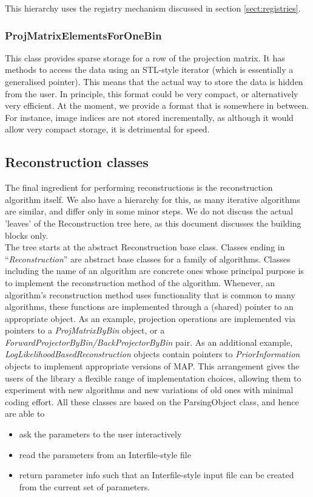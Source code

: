 \documentclass{article}
\begin{document}
This hierarchy uses the registry mechanism discussed in section 
\ref{sect:registries}.


\subsubsection{
ProjMatrixElementsForOneBin }

This class provides sparse storage for a row of the projection 
matrix. It has methods to access the data using an STL-style 
iterator (which is essentially a generalised pointer). This means 
that the actual way to store the data is hidden from the user. 
In principle, this format could be very compact, or alternatively 
very efficient. At the moment, we provide a format that is somewhere 
in between. For instance, image indices are not stored incrementally, 
as although it would allow very compact storage, it is detrimental 
for speed.

\subsection{
Reconstruction classes}

The final ingredient for performing reconstructions is the reconstruction 
algorithm itself. We also have a hierarchy for this, as many 
iterative algorithms are similar, and differ only in some minor 
steps. We do not discuss the actual 'leaves' of the Reconstruction 
tree here, as this document discusses the building blocks only. 
\\
The tree starts at the abstract Reconstruction base class. Classes 
ending in ``\textit{Reconstruction}'' are abstract base classes for 
a family of algorithms. Classes including the name of an algorithm 
are concrete ones whose principal purpose is to implement the 
reconstruction method of the algorithm. Whenever, an algorithm's 
reconstruction method uses functionality that is common to many 
algorithms, these functions are implemented through a (shared) 
pointer to an appropriate object. As an example, projection operations 
are implemented via pointers to a \textit{ProjMatrixByBin} object, 
or a \textit{ForwardProjectorByBin/BackProjectorByBin} pair. As an 
additional example, \textit{LogLikelihoodBasedReconstruction} objects 
contain pointers to \textit{PriorInformation} objects to implement 
appropriate versions of MAP. This arrangement gives the users 
of the library a flexible range of implementation choices, allowing 
them to experiment with new algorithms and new variations of 
old ones with minimal coding effort.
All these classes are based on the ParsingObject class, and hence 
are able to
\begin{itemize}
\item 
ask the parameters to the user interactively
\item 
read the parameters from an Interfile-style file
\item 
return parameter info such that an Interfile-style input file 
can be created from the current set of parameters.
\end{itemize}
\end{document}
